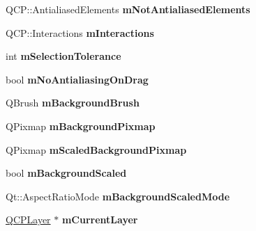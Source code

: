 \begin{DoxyCompactItemize}
\item 
Q\+C\+P\+::\+Antialiased\+Elements {\bfseries m\+Not\+Antialiased\+Elements}\hypertarget{classQCustomPlot_a2b6ebcad00a90ba07f146cefcd4293da}{}\label{classQCustomPlot_a2b6ebcad00a90ba07f146cefcd4293da}

\item 
Q\+C\+P\+::\+Interactions {\bfseries m\+Interactions}\hypertarget{classQCustomPlot_ad717377ceba7493b4b32f0bcbbdf1895}{}\label{classQCustomPlot_ad717377ceba7493b4b32f0bcbbdf1895}

\item 
int {\bfseries m\+Selection\+Tolerance}\hypertarget{classQCustomPlot_abc36e12dd0482117ad810a800c847722}{}\label{classQCustomPlot_abc36e12dd0482117ad810a800c847722}

\item 
bool {\bfseries m\+No\+Antialiasing\+On\+Drag}\hypertarget{classQCustomPlot_ac83df968435f6b8ec79f2993ab9124e8}{}\label{classQCustomPlot_ac83df968435f6b8ec79f2993ab9124e8}

\item 
Q\+Brush {\bfseries m\+Background\+Brush}\hypertarget{classQCustomPlot_a3aef5de4ac012178e3293248e9c63737}{}\label{classQCustomPlot_a3aef5de4ac012178e3293248e9c63737}

\item 
Q\+Pixmap {\bfseries m\+Background\+Pixmap}\hypertarget{classQCustomPlot_ae8f4677399324a78c5f8dbfb95a34f90}{}\label{classQCustomPlot_ae8f4677399324a78c5f8dbfb95a34f90}

\item 
Q\+Pixmap {\bfseries m\+Scaled\+Background\+Pixmap}\hypertarget{classQCustomPlot_a081bf046501d52642dc6d7e3bdb97d57}{}\label{classQCustomPlot_a081bf046501d52642dc6d7e3bdb97d57}

\item 
bool {\bfseries m\+Background\+Scaled}\hypertarget{classQCustomPlot_a62fe584b20680b1b2e1c7efb5c5416a5}{}\label{classQCustomPlot_a62fe584b20680b1b2e1c7efb5c5416a5}

\item 
Qt\+::\+Aspect\+Ratio\+Mode {\bfseries m\+Background\+Scaled\+Mode}\hypertarget{classQCustomPlot_ab82e8a5e3ad6b486f95d6da8bf49e9aa}{}\label{classQCustomPlot_ab82e8a5e3ad6b486f95d6da8bf49e9aa}

\item 
\hyperlink{classQCPLayer}{Q\+C\+P\+Layer} $\ast$ {\bfseries m\+Current\+Layer}\hypertarget{classQCustomPlot_aa27569c92e74395af10151357d268628}{}\label{classQCustomPlot_aa27569c92e74395af10151357d268628}


\end{DoxyCompactItemize}
